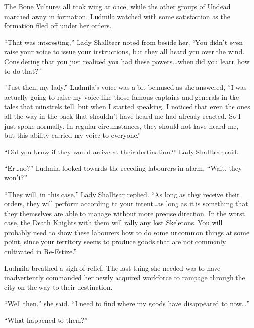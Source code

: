  

The Bone Vultures all took wing at once, while the other groups of Undead marched away in formation. Ludmila watched with some satisfaction as the formation filed off under her orders.

 

“That was interesting,” Lady Shalltear noted from beside her. “You didn’t even raise your voice to issue your instructions, but they all heard you over the wind. Considering that you just realized you had these powers...when did you learn how to do that?”

 

“Just then, my lady.” Ludmila’s voice was a bit bemused as she answered, “I was actually going to raise my voice like those famous captains and generals in the tales that minstrels tell, but when I started speaking, I noticed that even the ones all the way in the back that shouldn’t have heard me had already reacted. So I just spoke normally. In regular circumstances, they should not have heard me, but this ability carried my voice to everyone.”

 

“Did you know if they would arrive at their destination?” Lady Shalltear said.

 

“Er…no?” Ludmila looked towards the receding labourers in alarm, “Wait, they won’t?”

 

“They will, in this case,” Lady Shalltear replied. “As long as they receive their orders, they will perform according to your intent…as long as it is something that they themselves are able to manage without more precise direction. In the worst case, the Death Knights with them will rally any lost Skeletons. You will probably need to show these labourers how to do some uncommon things at some point, since your territory seems to produce goods that are not commonly cultivated in Re-Estize.”

 

Ludmila breathed a sigh of relief. The last thing she needed was to have inadvertently commanded her newly acquired workforce to rampage through the city on the way to their destination.

 

“Well then,” she said. “I need to find where my goods have disappeared to now…”

 

“What happened to them?”

 

